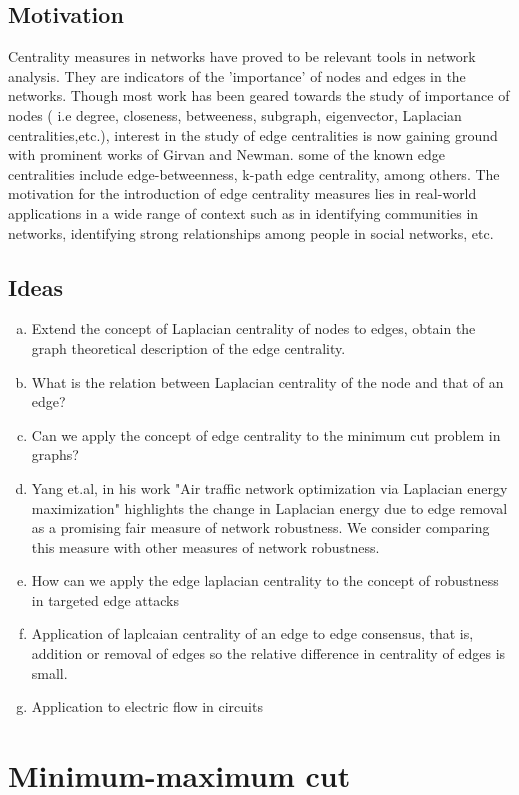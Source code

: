 \documentclass[10pt,a4paper]{article}
\begin{document}
	\subsection{Motivation}
	Centrality measures in networks have proved to be relevant tools in network analysis. They are indicators of the 'importance' of nodes and edges in the networks. Though most work has been geared towards the study of importance of nodes ( i.e degree, closeness, betweeness, subgraph, eigenvector, Laplacian centralities,etc.), interest in the study of edge centralities is now gaining ground with prominent works of  Girvan and Newman. some of the known edge centralities include edge-betweenness, k-path edge centrality, among others. The motivation for the introduction of edge centrality measures lies in real-world applications in a wide range of context such as in identifying communities in networks, identifying strong relationships among people in social networks, etc. 
	\subsection{Ideas}
	\begin{enumerate}[a)]
		\item Extend the concept of Laplacian centrality of  nodes to edges, obtain the graph theoretical description of the edge centrality.
		\item What is the relation between Laplacian centrality of the node and that of an edge?
		\item Can we apply the concept of edge centrality to the minimum cut problem in graphs?
		\item Yang et.al, in his work "Air traffic network optimization via Laplacian energy maximization" highlights the change in Laplacian energy due to edge removal as a promising fair measure of network robustness. We consider comparing this measure with other measures of network robustness.
		\item How can we apply the edge laplacian centrality to the concept of robustness in targeted edge attacks
		\item Application of laplcaian centrality of an edge to edge consensus, that is, addition or removal of edges so the relative difference in centrality of edges is small.
		\item Application to electric flow in circuits
	\end{enumerate}
	
	\section{Minimum-maximum cut}
\end{document}
